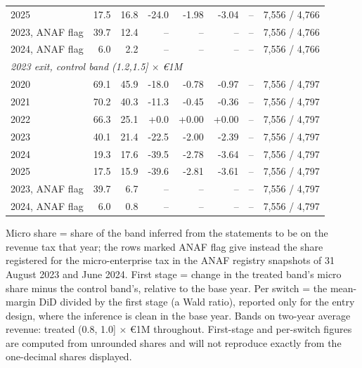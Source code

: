 \begin{table}[!tbp]
{\begin{tabular}{lrrrrrrr}
2025 & 17.5 & 16.8 & -24.0 & -1.98 & -3.04 & -- & 7,556 / 4,766 \\
2023, ANAF flag & 39.7 & 12.4 & -- & -- & -- & -- & 7,556 / 4,766 \\
2024, ANAF flag & 6.0 & 2.2 & -- & -- & -- & -- & 7,556 / 4,766 \\
\multicolumn{8}{l}{\emph{2023 exit, control band (1.2,1.5] $\times$ \euro{}1M}} \\
2020 & 69.1 & 45.9 & -18.0 & -0.78 & -0.97 & -- & 7,556 / 4,797 \\
2021 & 70.2 & 40.3 & -11.3 & -0.45 & -0.36 & -- & 7,556 / 4,797 \\
2022 & 66.3 & 25.1 & +0.0 & +0.00 & +0.00 & -- & 7,556 / 4,797 \\
2023 & 40.1 & 21.4 & -22.5 & -2.00 & -2.39 & -- & 7,556 / 4,797 \\
2024 & 19.3 & 17.6 & -39.5 & -2.78 & -3.64 & -- & 7,556 / 4,797 \\
2025 & 17.5 & 15.9 & -39.6 & -2.81 & -3.61 & -- & 7,556 / 4,797 \\
2023, ANAF flag & 39.7 & 6.7 & -- & -- & -- & -- & 7,556 / 4,797 \\
2024, ANAF flag & 6.0 & 0.8 & -- & -- & -- & -- & 7,556 / 4,797 \\
\bottomrule\end{tabular}}
\begin{minipage}{0.95\linewidth}\vspace{2pt}\footnotesize Micro share = share of the band inferred from the statements to be on the revenue tax that year; the rows marked ANAF flag give instead the share registered for the micro-enterprise tax in the ANAF registry snapshots of 31 August 2023 and June 2024. First stage = change in the treated band's micro share minus the control band's, relative to the base year. Per switch = the mean-margin DiD divided by the first stage (a Wald ratio), reported only for the entry design, where the inference is clean in the base year. Bands on two-year average revenue: treated (0.8, 1.0] $\times$ \euro{}1M throughout. First-stage and per-switch figures are computed from unrounded shares and will not reproduce exactly from the one-decimal shares displayed.\end{minipage}
\end{table}